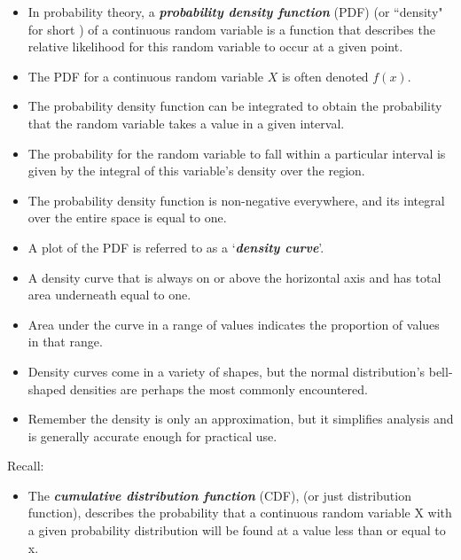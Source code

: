 \documentclass[12pt]{report}
\begin{document}
{%
{\LARGE
	
	\begin{itemize}
		\item
		In probability theory, a \textbf{\emph{probability density function}} (PDF) (or ``density" for short ) of a continuous random variable is a function that describes the relative likelihood for this random variable to occur at a given point.
		
		\item The PDF for a continuous random variable $X$ is often denoted $f(x)$.
		
		\item The probability density function can be integrated to obtain the probability that the random variable takes a value in a given interval.
		
		\item The probability for the random variable to fall within a particular interval is given by the integral of this variable's density over the region.
		
		\item The probability density function is non-negative everywhere, and its integral over the entire space is equal to one.
	\end{itemize}
}




\begin{itemize}
	\item A plot of the PDF is referred to as a `\textbf{\emph{density curve}}'.
	\item A density curve that is always on or above the horizontal axis and has total area underneath equal to one.
	\item Area under the curve in a range of values indicates the proportion of values in that range.
	\item Density curves come in a variety of shapes, but the normal distribution's bell-shaped densities are perhaps the most commonly encountered.
	\item Remember the density is only an approximation, but it simplifies analysis and is generally accurate enough for practical use.
\end{itemize}

{\LARGE
	Recall:
	\begin{itemize}
		\item The \textbf{\emph{cumulative distribution function}} (CDF), (or just distribution function), describes the probability that a continuous random variable X with a given probability distribution will be found at a value less than or equal to x.\\
		

\end{itemize}}}
\end{document}
